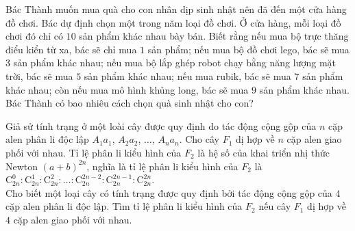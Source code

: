 \begin{bt}
	Bác Thành muốn mua quà cho con nhân dịp sinh nhật nên đã đến một cửa hàng đồ chơi. Bác dự định chọn một trong năm loại đồ chơi. Ở cửa hàng, mỗi loại đồ chơi đó chỉ có $10$ sản phẩm khác nhau bày bán. Biết rằng nếu mua bộ trực thăng điểu kiển từ xa, bác sẽ chỉ mua $1$ sản phẩm; nếu mua bộ đồ chơi lego, bác sẽ mua $3$ sản phẩm khác nhau; nếu mua bộ lắp ghép robot chạy bằng năng lượng mặt trời, bác sẽ mua $5$ sản phẩm khác nhau; nếu mua rubik, bác sẽ mua $7$ sản phẩm khác nhau; còn nếu mua mô hình khủng long, bác sẽ mua $9$ sản phẩm khác nhau. Bác Thành có bao nhiêu cách chọn quà sinh nhật cho con?
\end{bt}
\begin{bt}
	Giả sử tính trạng ở một loài cây được quy định do tác động cộng gộp của $n$ cặp alen phân li độc lập $A_1a_1$, $A_2a_2$, $\ldots$, $A_na_n$. Cho cây $F_1$ dị hợp về $n$ cặp alen giao phối với nhau. Tỉ lệ phân li kiểu hình của $F_2$ là hệ số của khai triển nhị thức Newton $(a+b)^{2n}$, nghĩa là tỉ lệ phân li kiểu hình của $F_2$ là $\mathrm{C}_{2n}^0\colon \mathrm{C}_{2n}^1\colon \mathrm{C}_{2n}^2\colon \ldots\colon \mathrm{C}_{2n}^{2n-2}\colon \mathrm{C}_{2n}^{2n-1}\colon \mathrm{C}_{2n}^{2n}$.\\
	Cho biết một loại cây có tính trạng được quy định bởi tác động cộng gộp của $4$ cặp alen phân li độc lập. Tìm tỉ lệ phân li kiểu hình của $F_2$ nếu cây $F_1$ dị hợp về $4$ cặp alen giao phối với nhau.
\end{bt}

